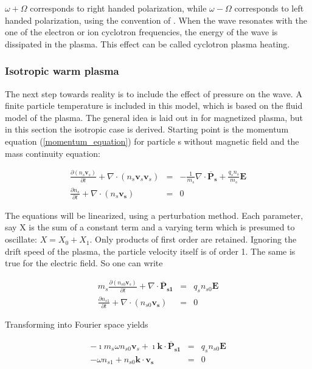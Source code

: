 \documentclass[a4paper,11pt]{thesis}
\begin{document}
$\omega+\Omega$ corresponds to right handed polarization, while $\omega-\Omega$ corresponds to left handed polarization, using the convention of \cite{stix}. When the wave resonates with the one of the electron or ion cyclotron frequencies, the energy of the wave is dissipated in the plasma. This effect can be called cyclotron plasma heating.


\subsubsection{Isotropic warm plasma}
The next step towards reality is to include the effect of pressure on the wave. A finite particle temperature is included in this model, which
is based on the fluid model of the plasma. The general idea is laid out in \cite{walker} for magnetized plasma, but in this section the isotropic case is derived. Starting point is the momentum equation (\ref{momentum_equation}) for particle s without magnetic field and the mass continuity equation:

\begin{eqnarray}
     \frac{\partial (n_s \mathbf{v}_s)}{\partial t}+ \nabla \cdot
     (n_s \mathbf{v}_s  \mathbf{v}_s) &=& -\frac{1}{m_s}\nabla \cdot
     \mathbf{\overline{P}_s} + \frac{q_s n_s}{m_s} \mathbf{E}\\
    \frac{\partial n_s}{\partial t} +  \nabla \cdot (n_s \mathbf{v_s} )&=&0
\end{eqnarray}

The equations will be linearized, using a perturbation method. Each parameter, say X is the sum of a constant term and a varying term which is presumed to oscillate: $X=X_0+X_1$. Only products of first order are retained. Ignoring the drift speed of the plasma, the particle velocity itself is of order 1. The same is true for the electric field. So one can write

\begin{eqnarray}
     m_s \frac{\partial (n_{s0} \mathbf{v}_s)}{\partial t}  +\nabla \cdot
     \mathbf{\overline{P}_{s1}} &=& q_s n_{s0} \mathbf{E}\\
    \frac{\partial n_{s1}}{\partial t} +  \nabla \cdot (n_{s0} \mathbf{v_s} )&=&0
\end{eqnarray}

Transforming into Fourier space yields

\begin{eqnarray}
     - \imath m_s \omega n_{s0} \mathbf{v}_s  + \imath \mathbf{k} \cdot
     \mathbf{\overline{P}_{s1}} &=& q_s n_{s0} \mathbf{E}\\
    -  \omega n_{s1} +   n_{s0} \mathbf{k} \cdot  \mathbf{v_s} &=&0
\end{eqnarray}
\end{document}
